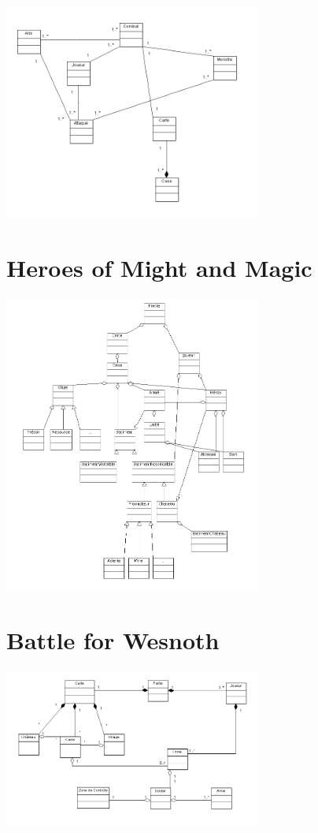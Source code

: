 \documentclass[a4paper,10pt]{report}
\begin{document}
		\includegraphics[width=320px]{diagrammes/concept_dofus.png}


	\section{Heroes of Might and Magic}
	
		\includegraphics[width=320px]{diagrammes/heroes_of_might_and_magic.png}


	\section{Battle for Wesnoth}
	
		\includegraphics[width=320px]{diagrammes/Concept-Battle-of-Wesnoth.png}
\end{document}
